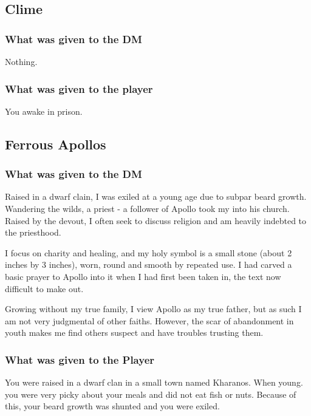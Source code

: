 \subsection{Clime}

\subsubsection{What was given to the DM}

Nothing.

\subsubsection{What was given to the player}

You awake in prison.

\subsection{Ferrous Apollos}

\subsubsection{What was given to the DM}

Raised in a dwarf clain, I was exiled at a young age due to subpar beard growth. Wandering the wilds, a priest - a follower of Apollo took my into his church. Raised by the devout, I often seek to discuss religion and am heavily indebted to the priesthood. 

I focus on charity and healing, and my holy symbol is a small stone (about 2 inches by 3 inches), worn, round and smooth by repeated use. I had carved a basic prayer to Apollo into it when I had first been taken in, the text now difficult to make out.

Growing without my true family, I view Apollo as my true father, but as such I am not very judgmental of other faiths. However, the scar of abandonment in youth makes me find others suspect and have troubles trusting them.

\subsubsection{What was given to the Player}

You were raised in a dwarf clan in a small town named Kharanos. When young. you were very picky about your meals and did not eat fish or nuts. Because of this, your beard growth was shunted and you were exiled. 

